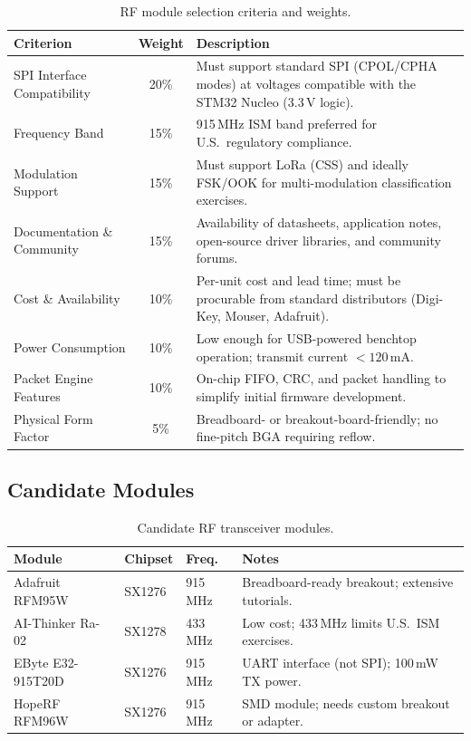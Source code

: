 \documentclass[11pt,letterpaper]{article}
\begin{document}
	\begin{table}[ht!]
		\centering
		\caption{RF module selection criteria and weights.}
		\label{tab:criteria}
		\renewcommand{\arraystretch}{1.3}
		\begin{tabularx}{\textwidth}{l c X}
			\toprule
			\textbf{Criterion} & \textbf{Weight} & \textbf{Description} \\
			\midrule
			SPI Interface Compatibility & 20\% & Must support standard SPI (CPOL/CPHA modes) at voltages compatible with the STM32 Nucleo (3.3\,V logic). \\
			Frequency Band & 15\% & 915\,MHz ISM band preferred for U.S.\ regulatory compliance. \\
			Modulation Support & 15\% & Must support LoRa (CSS) and ideally FSK/OOK for multi-modulation classification exercises. \\
			Documentation \& Community & 15\% & Availability of datasheets, application notes, open-source driver libraries, and community forums. \\
			Cost \& Availability & 10\% & Per-unit cost and lead time; must be procurable from standard distributors (Digi-Key, Mouser, Adafruit). \\
			Power Consumption & 10\% & Low enough for USB-powered benchtop operation; transmit current $< 120$\,mA. \\
			Packet Engine Features & 10\% & On-chip FIFO, CRC, and packet handling to simplify initial firmware development. \\
			Physical Form Factor & 5\% & Breadboard- or breakout-board-friendly; no fine-pitch BGA requiring reflow. \\
			\bottomrule
		\end{tabularx}
	\end{table}
	
	\subsection{Candidate Modules}
	
	\begin{table}[ht!]
		\centering
		\caption{Candidate RF transceiver modules.}
		\label{tab:candidates}
		\renewcommand{\arraystretch}{1.3}
		\begin{tabularx}{\textwidth}{l l l X}
			\toprule
			\textbf{Module} & \textbf{Chipset} & \textbf{Freq.} & \textbf{Notes} \\
			\midrule
			Adafruit RFM95W & SX1276 & 915\,MHz & Breadboard-ready breakout; extensive tutorials. \\
			AI-Thinker Ra-02 & SX1278 & 433\,MHz & Low cost; 433\,MHz limits U.S.\ ISM exercises. \\
			EByte E32-915T20D & SX1276 & 915\,MHz & UART interface (not SPI); 100\,mW TX power. \\
			HopeRF RFM96W & SX1276 & 915\,MHz & SMD module; needs custom breakout or adapter. \\
			\bottomrule
		\end{tabularx}
	\end{table}
	
\end{document}
